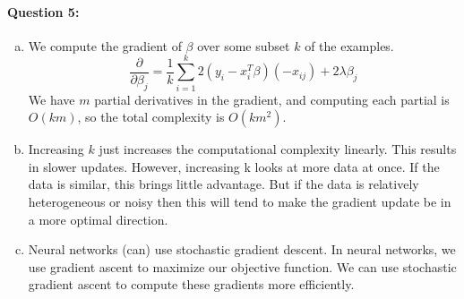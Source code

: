 \documentclass[letterpaper,11pt]{article}
\begin{document}
\paragraph{Question 5:}
\begin{enumerate}[(a)]
\item We compute the gradient of $\beta$ over some subset $k$ of the examples.
\begin{equation}
\frac{\partial}{\partial \beta_j} = \frac{1}{k} \sum_{i = 1}^k 2 (y_i - x_i^T \beta) (-x_{ij}) + 2 \lambda \beta_j
\end{equation}
We have $m$ partial derivatives in the gradient, and computing each partial is $O(km)$, so the total complexity is $O(k m^2)$.
\item Increasing $k$ just increases the computational complexity linearly. This results in slower updates. However, increasing k looks at more data at once. If the data is similar, this brings little advantage. But if the data is relatively heterogeneous or noisy then this will tend to make the gradient update be in a more optimal direction.
\item Neural networks (can) use stochastic gradient descent. In  neural networks, we use gradient ascent to maximize our objective function. We can use stochastic gradient ascent to compute these gradients more efficiently.
\end{enumerate}
\end{document}
